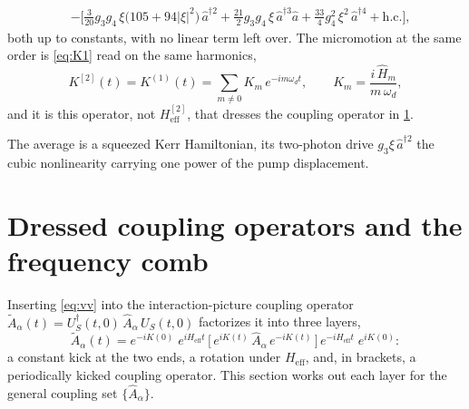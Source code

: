 \documentclass[a4paper,11pt]{article}
\newcommand{\eff}{\mathrm{eff}}
\begin{document}
\begin{example}
\begin{equation}
\begin{aligned}
  &-\Big[\tfrac{3}{20}g_3g_4\,\xi\big(105+94\lvert\xi\rvert^2\big)\,\hat a^{\dagger2}
   + \tfrac{21}{2}g_3g_4\,\xi\,\hat a^{\dagger3}\hat a
   + \tfrac{33}{4}g_4^2\,\xi^2\,\hat a^{\dagger4} + \mathrm{h.c.}\Big],
  \end{aligned}
\end{equation}
both up to constants, with no linear term left over. The micromotion at the same order is \eqref{eq:K1} read on the same harmonics,
\begin{equation}\label{eq:kpo-kick}
  K^{[2]}(t) = K^{(1)}(t) = \sum_{m\neq0} K_m\,e^{-im\omega_d t},
  \qquad
  K_m = \frac{i\,\hat H_m}{m\,\omega_d},
\end{equation}
and it is this operator, not $H_\eff^{[2]}$, that dresses the coupling operator in \cref{sec:comb}.

The average is a squeezed Kerr Hamiltonian, its two-photon drive $g_3\xi\,\hat a^{\dagger2}$ the cubic nonlinearity carrying one power of the pump displacement.
\end{example}

\section{Dressed coupling operators and the frequency comb}\label{sec:comb}

Inserting \cref{eq:vv} into the interaction-picture coupling operator $\tilde A_\alpha(t) = U_S^\dagger(t,0)\,\hat A_\alpha\,U_S(t,0)$ factorizes it into three layers,
\begin{equation}\label{eq:threelayers}
  \tilde A_\alpha(t)
  = e^{-iK(0)}\; e^{iH_\eff t}\,
  \big[\,e^{iK(t)}\,\hat A_\alpha\,e^{-iK(t)}\,\big]\,
  e^{-iH_\eff t}\; e^{iK(0)} :
\end{equation}
a constant kick at the two ends, a rotation under $H_\eff$, and, in brackets, a periodically kicked coupling operator. This section works out each layer for the general coupling set $\{\hat A_\alpha\}$.
\end{document}
